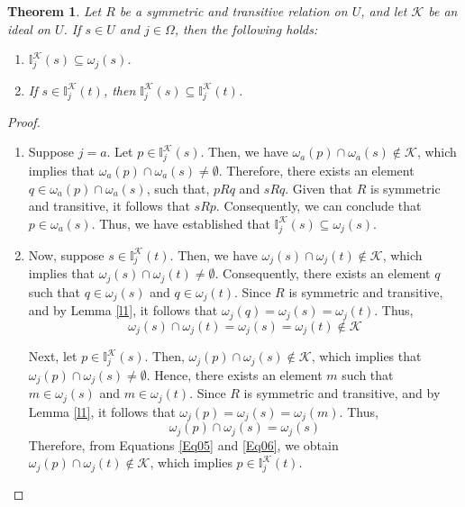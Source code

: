 \documentclass{article}
\theoremstyle{theorem}
\newtheorem{theorem}{Theorem}[section]
\theoremstyle{definition}
\theoremstyle{remark}
\begin{document}
\begin{theorem}\label{t4} \cite{Al-shami 2024} Let $R$ be a symmetric and transitive relation on $U$, and let $\mathcal{K}$ be an ideal on $U$. If $s \in U$ and  $j \in \Omega$, then the following holds:
\begin{enumerate}
\item $\mathbb{I}^{\mathcal{K}}_{j}(s) \subseteq \omega_{j}(s)$.

\item If $s \in \mathbb{I}^{\mathcal{K}}_{j}(t)$, then $\mathbb{I}^{\mathcal{K}}_{j}(s) \subseteq \mathbb{I}^{\mathcal{K}}_{j}(t)$.
\end{enumerate}
\end{theorem}
\begin{proof}
\begin{enumerate}
\item Suppose $j = a$. Let $p \in \mathbb{I}^{\mathcal{K}}_{j}(s)$. Then, we have $\omega_{a}(p) \cap \omega_{a}(s) \not\in \mathcal{K}$, which implies that $\omega_{a}(p) \cap \omega_{a}(s) \neq \emptyset$. Therefore, there exists an element $q \in \omega_{a}(p) \cap \omega_{a}(s)$, such that, $pRq$ and $sRq$. Given that  $R$ is symmetric and transitive, it follows that $sRp$. Consequently, we can conclude that $p \in \omega_{a}(s)$. Thus, we have established that $\mathbb{I}^{\mathcal{K}}_{j}(s) \subseteq \omega_{j}(s)$.

\item Now, suppose $s \in \mathbb{I}^{\mathcal{K}}_{j}(t)$. Then, we have $\omega_{j}(s) \cap \omega_{j}(t)$$\not\in$$\mathcal{K}$, which implies that $\omega_{j}(s) \cap \omega_{j}(t)$$\neq$$\emptyset$. Consequently, there exists an element $q$ such that $q \in \omega_{j}(s)$ and $q \in \omega_{j}(t)$. Since $R$ is symmetric and transitive, and by Lemma \ref{l1},  it follows that $\omega_{j}(q) = \omega_{j}(s) = \omega_{j}(t)$. Thus,
    \begin{equation}  \label{Eq05}
    \omega_{j}(s) \cap \omega_{j}(t) = \omega_{j}(s) = \omega_{j}(t) \not\in \mathcal{K}
    \end{equation}

Next, let $p \in \mathbb{I}^{\mathcal{K}}_{j}(s)$. Then, $\omega_{j}(p) \cap \omega_{j}(s) \not\in \mathcal{K}$, which implies that $\omega_{j}(p) \cap \omega_{j}(s) \neq \emptyset$. Hence, there exists an element $m$ such that $m \in \omega_{j}(s)$ and $m \in \omega_{j}(t)$. Since $R$ is symmetric and transitive, and by Lemma \ref{l1}, it follows that $\omega_{j}(p) = \omega_{j}(s) = \omega_{j}(m)$. Thus,
    \begin{equation}  \label{Eq06}
    \omega_{j}(p) \cap \omega_{j}(s) = \omega_{j}(s)
    \end{equation}
    Therefore, from Equations \ref{Eq05} and \ref{Eq06}, we obtain $\omega_{j}(p) \cap \omega_{j}(t) \not\in \mathcal{K}$, which implies $p \in \mathbb{I}^{\mathcal{K}}_{j}(t)$.
\end{enumerate}
\end{proof}
\end{document}
